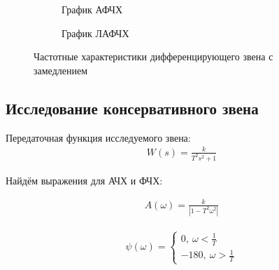 \documentclass[a4paper, 11pt]{article}
\begin{document}
\begin{figure}[h!]
    \begin{subfigure}{0.5\textwidth}
        \centering
        \caption{График АФЧХ}
    \end{subfigure}
    \begin{subfigure}{0.5\textwidth}
        \centering
        \caption{График ЛАФЧХ}
    \end{subfigure}
    \caption{Частотные характеристики дифференцирующего звена с замедлением}
\end{figure}

\newpage
\begin{center}
	\section{Исследование консервативного звена}
\end{center}

\par 
Передаточная функция исследуемого звена:
\begin{align}
	W(s) = \frac{k}{T^2s^2+1}
\end{align}
\par 
Найдём выражения для АЧХ и ФЧХ:

\begin{align}
	A(\omega)=\frac{k}{|1-T^2\omega^2|}
\end{align}

\begin{align}
\psi(\omega)=\left\{
\begin{matrix}
\displaystyle 0, \ \omega < \frac{1}{T} \\
\displaystyle -180, \  \omega > \frac{1}{T}
\end{matrix}
\right. 
\end{align}
\end{document}

